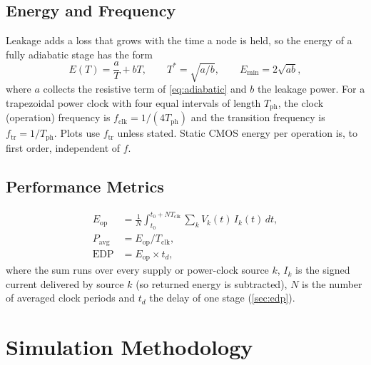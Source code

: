 \documentclass[conference]{IEEEtran}
\newcommand{\Tph}{T_{\mathrm{ph}}}
\newcommand{\Eop}{E_{\mathrm{op}}}
\newcommand{\EDP}{\mathrm{EDP}}
\begin{document}
\subsection{Energy and Frequency}
Leakage adds a loss that grows with the time a node is held, so the energy
of a fully adiabatic stage has the form
\begin{equation}
  E(T) = \frac{a}{T} + bT, \qquad
  T^{*} = \sqrt{a/b}, \qquad E_{\min} = 2\sqrt{ab},
  \label{eq:ucurve}
\end{equation}
where $a$ collects the resistive term of \cref{eq:adiabatic} and $b$ the
leakage power. For a trapezoidal power clock with four equal intervals of
length $\Tph$, the clock (operation) frequency is $f_{\mathrm{clk}}=1/(4\Tph)$
and the transition frequency is $f_{\mathrm{tr}}=1/\Tph$. Plots use
$f_{\mathrm{tr}}$ unless stated. Static CMOS energy per operation is, to
first order, independent of $f$.

\subsection{Performance Metrics}
\begin{align}
  \Eop  &= \frac{1}{N}\int_{t_0}^{t_0+NT_{\mathrm{clk}}}
           \sum_k V_k(t)\,I_k(t)\,dt, \label{eq:eop}\\
  P_{\mathrm{avg}} &= \Eop / T_{\mathrm{clk}}, \label{eq:pavg}\\
  \EDP  &= \Eop \times t_{d}, \label{eq:edp}
\end{align}
where the sum runs over every supply or power-clock source $k$, $I_k$ is the
signed current delivered by source $k$ (so returned energy is subtracted),
$N$ is the number of averaged clock periods and $t_d$ the delay of one
stage (\cref{sec:edp}).

\section{Simulation Methodology}
\label{sec:method}
\end{document}
